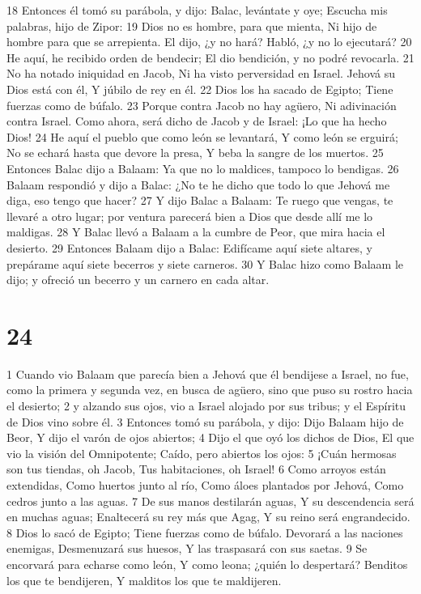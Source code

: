 18 Entonces él tomó su parábola, y dijo:
Balac, levántate y oye;
Escucha mis palabras, hijo de Zipor:
19 Dios no es hombre, para que mienta,
Ni hijo de hombre para que se arrepienta.
El dijo, ¿y no hará?
Habló, ¿y no lo ejecutará?
20 He aquí, he recibido orden de bendecir;
El dio bendición, y no podré revocarla.
21 No ha notado iniquidad en Jacob,
Ni ha visto perversidad en Israel.
Jehová su Dios está con él,
Y júbilo de rey en él.
22 Dios los ha sacado de Egipto;
Tiene fuerzas como de búfalo.
23 Porque contra Jacob no hay agüero,
Ni adivinación contra Israel.
Como ahora, será dicho de Jacob y de Israel:
¡Lo que ha hecho Dios!
24 He aquí el pueblo que como león se levantará,
Y como león se erguirá;
No se echará hasta que devore la presa,
Y beba la sangre de los muertos.
25 Entonces Balac dijo a Balaam: Ya que no lo maldices, tampoco lo bendigas.
26 Balaam respondió y dijo a Balac: ¿No te he dicho que todo lo que Jehová me diga, eso tengo que hacer?
27 Y dijo Balac a Balaam: Te ruego que vengas, te llevaré a otro lugar; por ventura parecerá bien a Dios que desde allí me lo maldigas.
28 Y Balac llevó a Balaam a la cumbre de Peor, que mira hacia el desierto.
29 Entonces Balaam dijo a Balac: Edifícame aquí siete altares, y prepárame aquí siete becerros y siete carneros.
30 Y Balac hizo como Balaam le dijo; y ofreció un becerro y un carnero en cada altar.

\chapter{24}


1 Cuando vio Balaam que parecía bien a Jehová que él bendijese a Israel, no fue, como la primera y segunda vez, en busca de agüero, sino que puso su rostro hacia el desierto;
2 y alzando sus ojos, vio a Israel alojado por sus tribus; y el Espíritu de Dios vino sobre él.
3 Entonces tomó su parábola, y dijo:
Dijo Balaam hijo de Beor,
Y dijo el varón de ojos abiertos;
4 Dijo el que oyó los dichos de Dios,
El que vio la visión del Omnipotente;
Caído, pero abiertos los ojos:
5 ¡Cuán hermosas son tus tiendas, oh Jacob,
Tus habitaciones, oh Israel! 
6 Como arroyos están extendidas,
Como huertos junto al río,
Como áloes plantados por Jehová,
Como cedros junto a las aguas.
7 De sus manos destilarán aguas,
Y su descendencia será en muchas aguas;
Enaltecerá su rey más que Agag,
Y su reino será engrandecido. 
8 Dios lo sacó de Egipto;
Tiene fuerzas como de búfalo.
Devorará a las naciones enemigas,
Desmenuzará sus huesos, 
Y las traspasará con sus saetas.
9 Se encorvará para echarse como león,
Y como leona; ¿quién lo despertará?
Benditos los que te bendijeren,
Y malditos los que te maldijeren.
